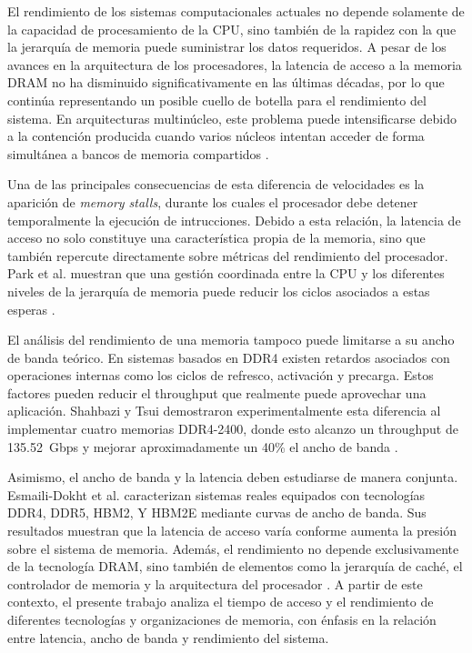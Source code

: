 
El rendimiento de los sistemas computacionales actuales no depende solamente
de la capacidad de procesamiento de la CPU, sino también de la rapidez con la
que la jerarquía de memoria puede suministrar los datos requeridos. A pesar de
los avances en la arquitectura de los procesadores, la latencia de acceso a la
memoria DRAM no ha disminuido significativamente en las últimas décadas, por
lo que continúa representando un posible cuello de botella para el rendimiento
del sistema. En arquitecturas multinúcleo, este problema puede intensificarse
debido a la contención producida cuando varios núcleos intentan acceder de
forma simultánea a bancos de memoria compartidos
\cite{alawneh2023dram}.

Una de las principales consecuencias de esta diferencia de velocidades es la 
aparición de \textit{memory stalls}, durante los cuales el procesador debe 
detener temporalmente la ejecución de intrucciones. Debido a esta relación,
la latencia de acceso no solo constituye una característica propia de la 
memoria, sino que también repercute directamente sobre métricas del rendimiento
del procesador. Park et al. muestran que una gestión coordinada entre la CPU 
y los diferentes niveles de la jerarquía de memoria puede reducir los ciclos 
asociados a estas esperas \cite{park2022dvfs}.

El análisis del rendimiento de una memoria tampoco puede limitarse a su ancho 
de banda teórico. En sistemas basados en DDR4 existen retardos asociados con
operaciones internas como los ciclos de refresco, activación y precarga. Estos
factores pueden reducir el throughput que realmente puede aprovechar una aplicación.
Shahbazi y Tsui demostraron experimentalmente esta diferencia al implementar 
cuatro memorias DDR4-2400, donde esto alcanzo un throughput de 135.52~Gbps y 
mejorar aproximadamente un 40\% el ancho de banda \cite{shahbazi2026ddr4}.

Asimismo, el ancho de banda y la latencia deben estudiarse de manera conjunta.
Esmaili-Dokht et al. caracterizan sistemas reales equipados con tecnologías
DDR4, DDR5, HBM2, Y HBM2E mediante curvas de ancho de banda. Sus resultados
muestran que la latencia de acceso varía conforme aumenta la presión sobre el
sistema de memoria. Además, el rendimiento no depende exclusivamente de la
tecnología DRAM, sino también de elementos como la jerarquía de caché, el 
controlador de memoria y la arquitectura del procesador \cite{esmailidokht2024mess}.
A partir de este contexto, el presente trabajo analiza el tiempo de acceso y el
rendimiento de diferentes tecnologías y organizaciones de memoria, con énfasis
en la relación entre latencia, ancho de banda y rendimiento del sistema.
